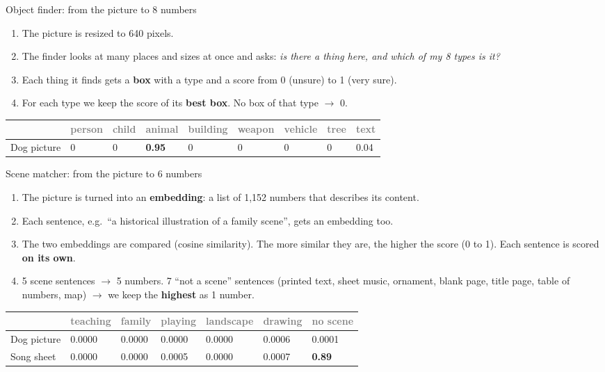 \documentclass[aspectratio=169,11pt]{beamer}
\newcommand{\h}[1]{\textcolor{grey}{#1}}
\newcommand{\remark}[1]{\par\vspace{0.35cm}{\small\textcolor{grey}{#1}}}
\begin{document}
\begin{frame}{Object finder: from the picture to 8 numbers}
\begin{enumerate}\setlength\itemsep{5pt}
  \item The picture is resized to 640 pixels.
  \item The finder looks at many places and sizes at once and asks: \emph{is there a thing here, and which of my 8 types is it?}
  \item Each thing it finds gets a \textbf{box} with a type and a score from 0 (unsure) to 1 (very sure).
  \item For each type we keep the score of its \textbf{best box}. No box of that type $\to$ 0.
\end{enumerate}
\vspace{0.3cm}
\small
\begin{tabular}{@{}l *{8}{C{1.2cm}}@{}}
\toprule
 & \h{person} & \h{child} & \h{animal} & \h{building} & \h{weapon} & \h{vehicle} & \h{tree} & \h{text}\\
\midrule
Dog picture & 0 & 0 & \textbf{0.95} & 0 & 0 & 0 & 0 & 0.04\\
\bottomrule
\end{tabular}
\remark{One clear box around the dog (animal 0.95) and a faint hint of text (0.04). Nothing else was found.}
\end{frame}

\begin{frame}{Scene matcher: from the picture to 6 numbers}
\small
\begin{enumerate}\setlength\itemsep{3pt}
  \item The picture is turned into an \textbf{embedding}: a list of 1,152 numbers that describes its content.
  \item Each sentence, e.g.\ ``a historical illustration of a family scene'', gets an embedding too.
  \item The two embeddings are compared (cosine similarity). The more similar they are, the higher the score (0 to 1). Each sentence is scored \textbf{on its own}.
  \item 5 scene sentences $\to$ 5 numbers. 7 ``not a scene'' sentences (printed text, sheet music, ornament, blank page, title page, table of numbers, map) $\to$ we keep the \textbf{highest} as 1 number.
\end{enumerate}
\vspace{0.2cm}
\small
\begin{tabular}{@{}l *{6}{C{1.45cm}}@{}}
\toprule
 & \h{teaching} & \h{family} & \h{playing} & \h{landscape} & \h{drawing} & \h{no scene}\\
\midrule
Dog picture & 0.0000 & 0.0000 & 0.0000 & 0.0000 & 0.0006 & 0.0001\\
Song sheet & 0.0000 & 0.0000 & 0.0005 & 0.0000 & 0.0007 & \textbf{0.89}\\
\bottomrule
\end{tabular}
\remark{For the dog no sentence fits well. For the song sheet a ``not a scene'' sentence fits strongly (0.89).}
\end{frame}
\end{document}

